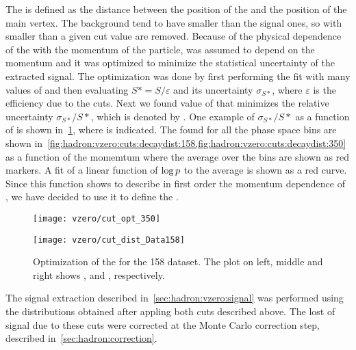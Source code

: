 The \decaydist is defined as the distance between the position
of the \vzero and the position of the main vertex.
The background \vzeros tend to have smaller \decaydist than
the signal ones, so \vzero with \decaydist
smaller than a given cut value \decaydistmin are removed.
Because of the physical dependence of the \decaydist with
the momentum of the particle, \decaydistmin was assumed to
depend on the \vzero momentum and it was optimized to minimize
the statistical uncertainty of the extracted signal.
The optimization was done by first performing the \minv fit
with many values of \decaydistmin and then evaluating
$S* = S/\varepsilon$ and its uncertainty $\sigma_{S*}$,
where $\varepsilon$ is the efficiency due to the \vzero cuts.
Next we found value of \decaydistmin that minimizes the
relative uncertainty $\sigma_{S*}/S*$, which is denoted by \decaydistopt.
One example of $\sigma_{S*}/S*$ as a function of \decaydistmin is
shown in~\cref{fig:hadron:vzero:cuts:decaydist:example}, where \decaydistopt is indicated.
The \decaydistopt found for all the phase space bins
are shown in~\cref{fig:hadron:vzero:cuts:decaydist:158,fig:hadron:vzero:cuts:decaydist:350}
as a function of the \vzero momemtum
where the average over the \pT bins are shown as red markers.
A fit of a linear function of $\log p$ to the average \decaydistopt
is shown as a red curve. Since this function shows to describe
in first order the momentum dependence of \decaydistopt,
we have decided to use it to define the \decaydistmin.

\begin{figure}
  \centering
  \texttt{[image: vzero/cut\_opt\_350]}
  
  \caption{}
  \label{fig:hadron:vzero:cuts:decaydist:example}
\end{figure}

\begin{figure}
  \centering
  \texttt{[image: vzero/cut\_dist\_Data158]}
  
  \caption{Optimization of the \decaydistmin for the 158 \GeVc dataset. The plot on left, middle and right shows \lamb, \antilamb and \kzeros, respectively.}
  \label{fig:hadron:vzero:cuts:decaydist:158}
\end{figure}

The signal extraction described in~\cref{sec:hadron:vzero:signal}
was performed using the \minv distributions obtained
after appling both \vzero cuts described above.
The lost of signal \vzeros due to these cuts were corrected
at the Monte Carlo correction step, described in~\cref{sec:hadron:correction}.

